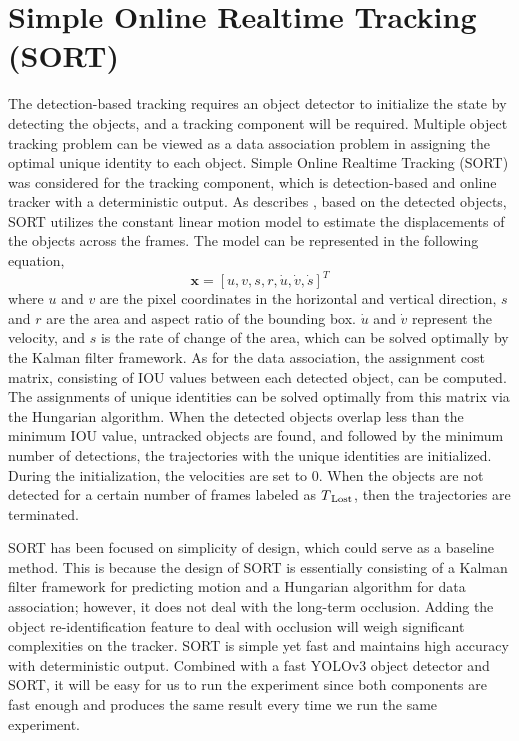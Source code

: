 \section{Simple Online Realtime Tracking (SORT)}
\label{sec:background/section_b}

The detection-based tracking requires an object detector to initialize the state by detecting the objects, and a tracking component will be required. Multiple object tracking problem can be viewed as a data association problem in assigning the optimal unique identity to each object. Simple Online Realtime Tracking (SORT) was considered for the tracking component, which is detection-based and online tracker with a deterministic output. As \citeauthor{bewley_simple_2016} describes \cite{bewley_simple_2016}, based on the detected objects, SORT utilizes the constant linear motion model to estimate the displacements of the objects across the frames. The model can be represented in the following equation,
\begin{equation}
\textbf{x} = [u, v, s, r, \dot{u}, \dot{v}, \dot{s}]^T
\label{eq:SORT_model}
\end{equation}
where $u$ and $v$ are the pixel coordinates in the horizontal and vertical direction, $s$ and $r$ are the area and aspect ratio of the bounding box. $\dot{u}$ and $\dot{v}$ represent the velocity, and $s$ is the rate of change of the area, which can be solved optimally by the Kalman filter framework. As for the data association, the assignment cost matrix, consisting of IOU values between each detected object, can be computed. The assignments of unique identities can be solved optimally from this matrix via the Hungarian algorithm. When the detected objects overlap less than the minimum IOU value, untracked objects are found, and followed by the minimum number of detections, the trajectories with the unique identities are initialized. During the initialization, the velocities are set to 0. When the objects are not detected for a certain number of frames labeled as $T\textsubscript{Lost}$, then the trajectories are terminated.

SORT has been focused on simplicity of design, which could serve as a baseline method. This is because the design of SORT is essentially consisting of a Kalman filter framework for predicting motion and a Hungarian algorithm for data association; however, it does not deal with the long-term occlusion. Adding the object re-identification feature to deal with occlusion will weigh significant complexities on the tracker. SORT is simple yet fast and maintains high accuracy with deterministic output. Combined with a fast YOLOv3 object detector and SORT, it will be easy for us to run the experiment since both components are fast enough and produces the same result every time we run the same experiment.